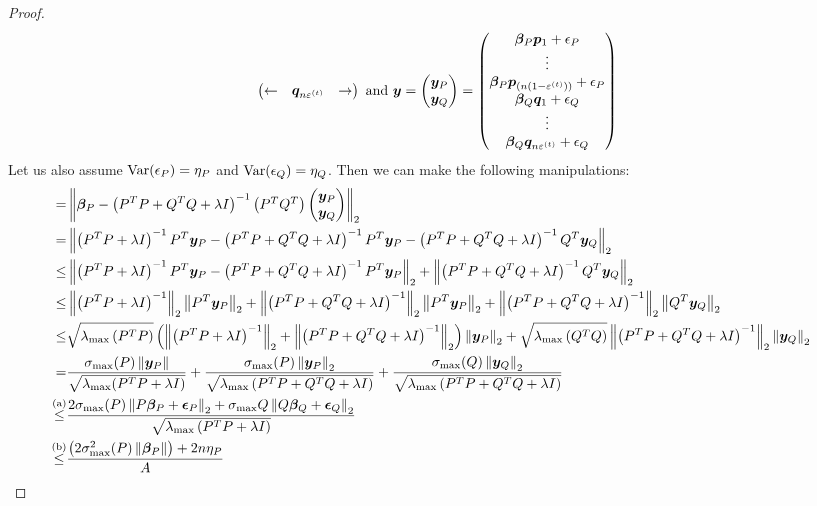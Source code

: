 \documentclass{article} %
\newcommand{\norm}[1]{\left\lVert#1\right\rVert}
\begin{document}
\begin{appendices}
\begin{proof}
\begin{equation*}
\begin{pmatrix}
			\leftarrow & {\bm{q}}_{n\varepsilon^{(t)}} & \rightarrow
		\end{pmatrix}\text{ and } {\bm{y}} = \begin{pmatrix}{\bm{y}}_P \\ {\bm{y}}_Q \end{pmatrix} = \begin{pmatrix} {\bm{\beta}}_P{\bm{p}}_1 + {\epsilon}_P \\ \vdots \\ {\bm{\beta}}_P{\bm{p}}_{(n(1-\varepsilon^{(t)}))} + {\epsilon}_P \\ {\bm{\beta}}_Q{\bm{q}}_1 + {\epsilon}_Q\\ \vdots \\ {\bm{\beta}}_Q{\bm{q}}_{n\varepsilon^{(t)}} + {\epsilon}_Q\end{pmatrix}
	\end{equation*}
	Let us also assume $\mathrm{Var}({\epsilon}_P) = \eta_P$ and $\mathrm{Var}({\epsilon}_Q) = \eta_Q$. Then we can make the following manipulations:
	\begin{align*}
		= &\norm{\vbeta_P - \left(P^T P + Q^T Q + \lambda I\right)^{-1}\begin{pmatrix}P^T Q^T\end{pmatrix}\begin{pmatrix}\vy_P \\ \vy_Q \end{pmatrix}}_2 &&\\
		= &\norm{\left(P^T P + \lambda I\right)^{-1} P^T \vy_P - \left(P^T P + Q^T Q + \lambda I\right)^{-1}P^T \vy_P  - \left(P^T P + Q^T Q + \lambda I\right)^{-1}Q^T \vy_Q}_2 &&\\
		\leq &\norm{\left(P^T P + \lambda I\right)^{-1} P^T \vy_P -\left(P^T P + Q^T Q+ \lambda I\right)^{-1}P^T \vy_P}_2 + \norm{\left(P^T P + Q^T Q+ \lambda I\right)^{-1}Q^T \vy_Q}_2 &&\\
		\leq& \norm{\left(P^T P + \lambda I\right)^{-1}}_2 \norm{P^T\vy_P}_2 + \norm{\left(P^T P + Q^T Q + \lambda I\right)^{-1}}_2\norm{P^T \vy_P}_2 + \norm{\left(P^T P + Q^T Q + \lambda I\right)^{-1}}_2\norm{Q^T \vy_Q}_2&&\\
		\leq & \sqrt{\lambda_{\max}\left(P^T P\right)}\left(\norm{\left(P^TP + \lambda I\right)^{-1}}_2+\norm{\left(P^T P + Q^T Q + \lambda I\right)^{-1}}_2\right)\norm{\vy_P}_2 + \sqrt{\lambda_{\max}\left(Q^T Q\right)}\norm{\left(P^T P + Q^T Q + \lambda I\right)^{-1}}_2\norm{\vy_Q}_2 &&\\
		= &\frac{\sigma_{\max}(P)\norm{\vy_P}}{\sqrt{\lambda_{\max}(P^TP + \lambda I)}} + \frac{\sigma_{\max}(P)\norm{\vy_P}_2}{\sqrt{\lambda_{\max}\left(P^T P + Q^T Q + \lambda I\right)}} + \frac{\sigma_{\max}(Q)\norm{\vy_Q}_2}{\sqrt{\lambda_{\max}\left(P^T P + Q^T Q + \lambda I\right)}} &&\\
		\overset{\mathrm{(a)}}{\leq} &\frac{2\sigma_{\max}(P)\norm{P\vbeta_P + \veps_P}_2 + \sigma_{\max}{Q}\norm{Q\vbeta_Q + \veps_Q}_2}{\sqrt{\lambda_{\max}\left(P^T P + \lambda I\right)}} &&\\
		\overset{\mathrm{(b)}}{\leq} & \frac{\left(2\sigma^2_{\max}(P)\norm{\vbeta_P}\right) + 2n\eta_P}{A} &&\\
	\end{align*}
	

\end{proof}
\end{appendices}
\end{document}
